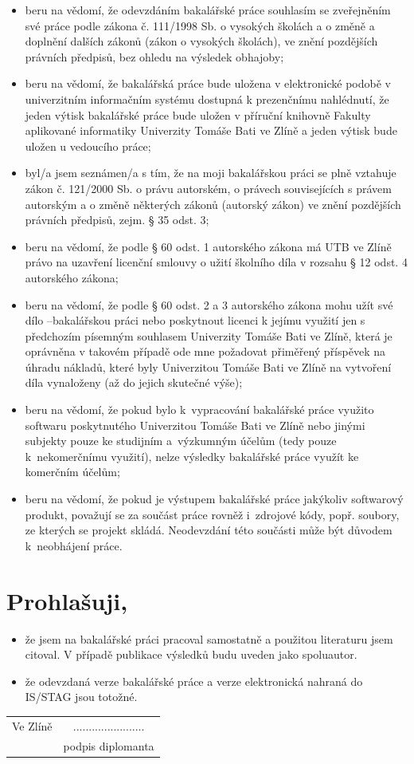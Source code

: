 \documentclass[a4paper,12pt]{article}
\newcommand{\nmm}[1]{\section*{#1}} %
\begin{document}
\begin{itemize}\fontsize{10}{1}
\normalsize
\item beru na vědomí, že odevzdáním bakalářské práce souhlasím se zveřejněním své práce podle zákona č. 111/1998 Sb. o vysokých školách a o změně a doplnění dalších zákonů (zákon o vysokých školách), ve znění pozdějších právních předpisů, bez ohledu na výsledek obhajoby;
\item beru na vědomí, že bakalářská práce bude uložena v elektronické podobě v univerzitním informačním systému dostupná k prezenčnímu nahlédnutí, že jeden výtisk bakalářské práce bude uložen v příruční knihovně Fakulty aplikované informatiky Univerzity Tomáše Bati ve Zlíně a jeden výtisk bude uložen u vedoucího práce; 
\item byl/a jsem seznámen/a s tím, že na moji bakalářskou práci se plně vztahuje zákon č. 121/2000 Sb. o právu autorském, o právech souvisejících s právem autorským a o změně některých zákonů (autorský zákon) ve znění pozdějších právních předpisů, zejm. § 35 odst. 3;
\item beru na vědomí, že podle § 60 odst. 1 autorského zákona má UTB ve Zlíně právo na uzavření licenční smlouvy o užití školního díla v rozsahu § 12 odst. 4 autorského zákona;
\item beru na vědomí, že podle § 60 odst. 2 a 3 autorského zákona mohu užít své dílo –bakalářskou práci nebo poskytnout licenci k jejímu využití jen s předchozím písemným souhlasem Univerzity Tomáše Bati ve Zlíně, která je oprávněna v takovém případě ode mne požadovat přiměřený příspěvek na úhradu nákladů, které byly Univerzitou Tomáše Bati ve Zlíně na vytvoření díla vynaloženy (až do jejich skutečné výše);
\item beru na vědomí, že pokud bylo k~vypracování bakalářské práce využito softwaru poskytnutého Univerzitou Tomáše Bati ve Zlíně nebo jinými subjekty pouze ke studijním a~výzkumným účelům (tedy pouze k~nekomerčnímu využití), nelze výsledky bakalářské práce využít ke komerčním účelům;
\item beru na vědomí, že pokud je výstupem bakalářské práce jakýkoliv softwarový produkt, považují se za součást práce rovněž i~zdrojové kódy, popř. soubory, ze kterých se projekt skládá. Neodevzdání této součásti může být důvodem k~neobhájení práce.
\end{itemize}
\nmm{Prohlašuji,}
\begin{itemize}
 \normalsize
\item že jsem na bakalářské práci pracoval samostatně a použitou literaturu jsem citoval. V případě publikace výsledků budu uveden jako spoluautor.
\item že odevzdaná verze bakalářské práce a verze elektronická nahraná do IS/STAG jsou totožné.
\end{itemize}
\vspace{1cm}
\begin{tabular}{lc}
Ve Zlíně &\hspace{9cm} .......................\\
~ &\hspace{9cm} podpis diplomanta
\end{tabular}
\end{document}
